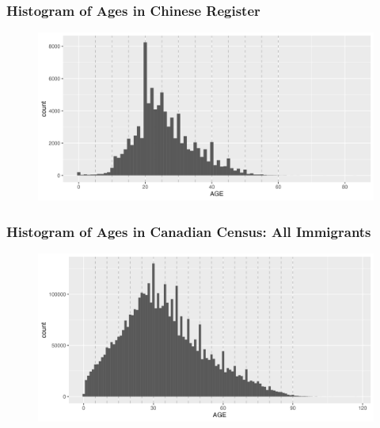\documentclass[xcolor=dvipsnames, compress, 12pt, aspectratio=169, handout]{beamer}
\begin{document}
\begin{frame}
    \frametitle{Histogram of Ages in Chinese Register \hyperlink{whipple}{}}
    \label{agehist}
    \begin{figure}
        \centering
        \includegraphics[width=\textwidth]{../../figs/5oct23/agehist.png}
    \end{figure}
\end{frame}

\begin{frame}
    \frametitle{Histogram of Ages in Canadian Census: All Immigrants \hyperlink{whipple}{}}
    \label{agehist}
    \begin{figure}
        \centering
        \includegraphics[width=\textwidth]{../../figs/5oct23/agehist_censusall.png}
    \end{figure}
\end{frame}
\end{document}
